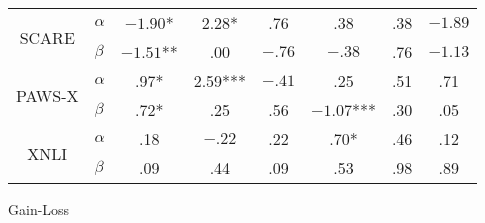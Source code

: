{{\begin{tabular}{llcccccc}
      \multicolumn{1}{c}{\multirow{2}{*}{SCARE}}   & $\alpha$  & \multicolumn{1}{c|}{\cellcolor{dark-blue} $-1.90$*}   & \multicolumn{1}{c|}{\cellcolor{dark-blue} 2.28*}     & \multicolumn{1}{c|}{\cellcolor{dark-blue} .76}        & \multicolumn{1}{c|}{\cellcolor{dark-blue} .38}         & \multicolumn{1}{c|}{\cellcolor{dark-blue} .38}      & \multicolumn{1}{c}{\cellcolor{blue} $-1.89$}        \\
      \multicolumn{1}{c}{}                         & $\beta$   & \multicolumn{1}{c|}{\cellcolor{blue} $-1.51$**}       & \multicolumn{1}{c|}{\cellcolor{llight-blue} .00}     & \multicolumn{1}{c|}{\cellcolor{blue} $-.76$}          & \multicolumn{1}{c|}{\cellcolor{dark-blue} $-.38$}      & \multicolumn{1}{c|}{\cellcolor{blue} .76}           & \multicolumn{1}{c}{\cellcolor{dark-blue} $-1.13$}   \\ \cline{3-8}
      \multicolumn{1}{c}{\multirow{2}{*}{PAWS-X}}  & $\alpha$  & \multicolumn{1}{c|}{\cellcolor{blue} .97*}            & \multicolumn{1}{c|}{\cellcolor{dark-blue} 2.59***}   & \multicolumn{1}{c|}{\cellcolor{blue} $-.41$}          & \multicolumn{1}{c|}{\cellcolor{dark-blue} .25}         & \multicolumn{1}{c|}{\cellcolor{llight-blue} .51}     & \multicolumn{1}{c}{\cellcolor{dark-blue} .71}       \\
      \multicolumn{1}{c}{}                         & $\beta$   & \multicolumn{1}{c|}{\cellcolor{dark-blue} .72*}       & \multicolumn{1}{c|}{\cellcolor{dark-blue} .25}       & \multicolumn{1}{c|}{\cellcolor{blue} .56}             & \multicolumn{1}{c|}{\cellcolor{dark-blue} $-1.07$***}  & \multicolumn{1}{c|}{\cellcolor{dark-blue} .30}      & \multicolumn{1}{c}{\cellcolor{dark-blue} .05}       \\ \cline{3-8}
      \multicolumn{1}{c}{\multirow{2}{*}{XNLI}}    & $\alpha$  & \multicolumn{1}{c|}{\cellcolor{blue} .18}             & \multicolumn{1}{c|}{\cellcolor{blue} $-.22$}         & \multicolumn{1}{c|}{\cellcolor{blue} .22}             & \multicolumn{1}{c|}{\cellcolor{blue} .70*}             & \multicolumn{1}{c|}{\cellcolor{dark-blue} .46}      & \multicolumn{1}{c}{\cellcolor{dark-blue} .12}       \\
      \multicolumn{1}{c}{}                         & $\beta$   & \multicolumn{1}{c|}{\cellcolor{blue} .09}             & \multicolumn{1}{c|}{\cellcolor{dark-blue} .44}       & \multicolumn{1}{c|}{\cellcolor{dark-blue} .09}        & \multicolumn{1}{c|}{\cellcolor{blue} .53}              & \multicolumn{1}{c|}{\cellcolor{blue} .98}           & \multicolumn{1}{c}{\cellcolor{dark-blue} .89}       \\ %
     \end{tabular}
    }
  }{Gain-Loss}

